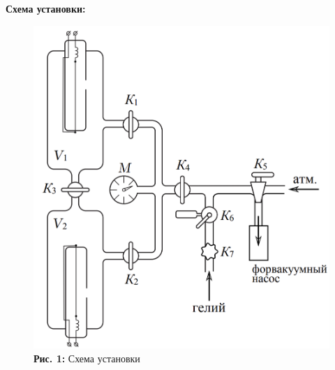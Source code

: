\documentclass[12pt,a4paper]{scrartcl}
\begin{document}
	\textbf{Схема установки:}
	\begin{center}
		\begin{figure}[h]
			\begin{minipage}{0.5\linewidth}
				\begin{center}
					\includegraphics[scale=0.3]{PIC_1.png}
					\\\textbf{Рис. 1:} Схема установки
				\end{center}
			\end{minipage}
		\begin{minipage}{0.5\linewidth}
			\begin{center}

\end{center}
\end{minipage}
\end{figure}
\end{center}
\end{document}
